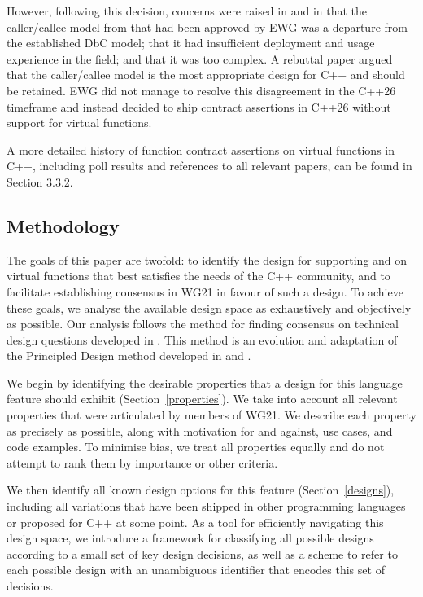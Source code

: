 However, following this decision, concerns were raised in \cite{P3506R0} and in \cite{P3573R0} that the caller/callee model from \cite{P3097R0} that had been approved by EWG was a departure from the established DbC model; that it had insufficient deployment and usage experience in the field; and that it was too complex. A rebuttal paper \cite{P3506R0} argued that the caller/callee model is the most appropriate design for C++ and should be retained. EWG did not manage to resolve this disagreement in the C++26 timeframe and instead decided to ship contract assertions in C++26 without support for virtual functions.

A more detailed history of function contract assertions on virtual functions in C++, including poll results and references to all relevant papers, can be found in \cite{P2899R1} Section 3.3.2.

\subsection{Methodology}

The goals of this paper are twofold: to identify the design for supporting  and  on virtual functions that best satisfies the needs of the C++ community, and to facilitate establishing consensus in WG21 in favour of such a design. To achieve these goals, we analyse the available design space as exhaustively and objectively as possible. Our analysis follows the method for finding consensus on technical design questions developed in \cite{P3099R0}. This method is an evolution and adaptation of the Principled Design method developed in \cite{P3004R0} and \cite{P3005R0}.

We begin by identifying the desirable properties that a design for this language feature should exhibit (Section~\ref{properties}). We take into account all relevant properties that were articulated by members of WG21. We describe each property as precisely as possible, along with motivation for and against, use cases, and code examples. To minimise bias, we treat all properties equally and do not attempt to rank them by importance or other criteria.

We then identify all known design options for this feature (Section~\ref{designs}), including all variations that have been shipped in other programming languages or proposed for C++ at some point. As a tool for efficiently navigating this design space, we introduce a framework for classifying all possible designs according to a small set of key design decisions, as well as a scheme to refer to each possible design with an unambiguous identifier that encodes this set of decisions.


